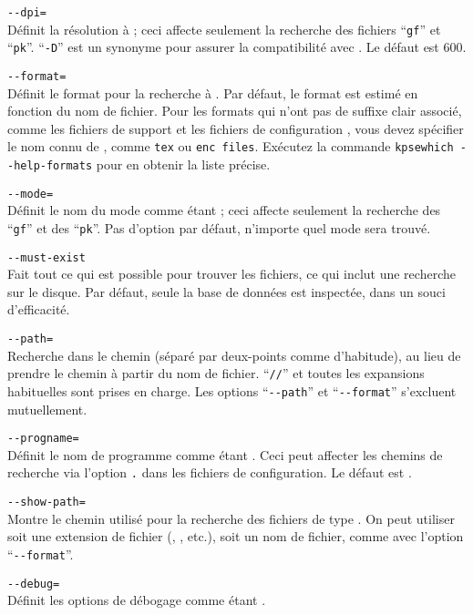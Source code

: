 \documentclass[german, english, french]{article}
\renewcommand{\samp}[1]{\enquote{\texttt{#1}}}
\begin{document}
\begin{ttdescription}
\item[\texttt{-{}-dpi=\var{num}}]\mbox{} \\
  Définit la résolution à  ; ceci affecte seulement la recherche des
  fichiers \samp{gf} et \samp{pk}. \samp{-D} est un synonyme pour assurer la
  compatibilité avec . Le défaut est 600.
\item[\texttt{-{}-format=\var{name}}]\mbox{}\\
  Définit le format pour la recherche à .  Par défaut, le format est
  estimé en fonction du nom de fichier.  Pour les formats qui n'ont pas de
  suffixe clair associé, comme les fichiers de support \MP{} et les fichiers de
  configuration , vous devez spécifier le nom connu de \KPS,
  comme \texttt{tex} ou \texttt{enc files}. Exécutez la commande
  \texttt{kpsewhich -{}-help-formats} pour en obtenir la liste précise.

\item[\texttt{-{}-mode=\var{string}}]\mbox{}\\
  Définit le nom du mode comme étant  ; ceci affecte seulement la
  recherche des \samp{gf} et des \samp{pk}.  Pas d'option par défaut, n'importe
  quel mode sera trouvé.
\item[\texttt{-{}-must-exist}]\mbox{}\\
  Fait tout ce qui est possible pour trouver les fichiers, ce qui inclut une
  recherche sur le disque. Par défaut, seule la base de données  est
  inspectée, dans un souci d'efficacité.
\item[\texttt{-{}-path=\var{string}}]\mbox{}\\
  Recherche dans le chemin  (séparé par deux-points comme
  d'habitude), au lieu de prendre le chemin à partir du nom de
  fichier. \samp{//} et toutes les expansions habituelles sont prises en charge.
  Les options \samp{-{}-path} et \samp{-{}-format} s'excluent mutuellement.
\item[\texttt{-{}-progname=\var{name}}]\mbox{}\\
  Définit le nom de programme comme étant .  Ceci peut affecter les
  chemins de recherche via l'option \texttt{.} dans les fichiers
  de configuration.  Le défaut est .
\item[\texttt{-{}-show-path=\var{name}}]\mbox{}\\
  Montre le chemin utilisé pour la recherche des fichiers de type .
  On peut utiliser soit une extension de fichier (, , etc.),
  soit un nom de fichier, comme avec l'option \samp{-{}-format}.
\item[\texttt{-{}-debug=\var{num}}]\mbox{}\\
  Définit les options de débogage comme étant .
\end{ttdescription}
\end{document}
